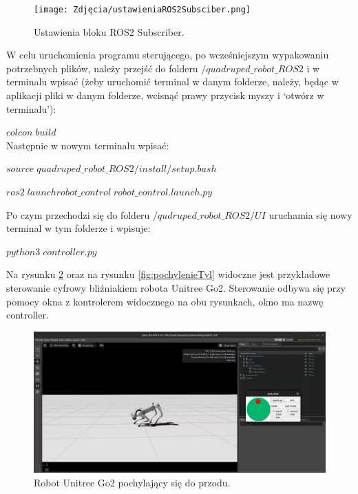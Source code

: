 \documentclass[12pt]{article}
\begin{document}
\begin{figure}[h]
    \centering
    \texttt{[image: Zdjęcia/ustawieniaROS2Subsciber.png]}
    \caption{Ustawienia bloku ROS2 Subscriber.}
    \label{fig:subscriberROS2}
\end{figure}



\noindent W celu uruchomienia programu sterującego, po wcześniejszym wypakowaniu potrzebnych plików,  należy przejść do folderu $/quadruped\_robot\_ROS2$ i w terminalu wpisać (żeby uruchomić terminal w danym folderze, należy, będąc w aplikacji pliki w danym folderze, wcisnąć prawy przycisk myszy i ‘otwórz w terminalu’):

\noindent $colcon\; build$\\

Następnie w nowym terminalu wpisać:


$source\; quadruped\_robot\_ROS2/install/setup.bash$

$ros2\; launch robot\_control\; robot\_control.launch.py$

\vspace{15px}

 \noindent Po czym przechodzi się do folderu $/qudruped\_robot\_ROS2/UI$ uruchamia się nowy terminal w tym folderze i wpisuje:

$python3\; controller.py$

\clearpage
 
\noindent Na rysunku \ref{fig:pochyleniePrzod} oraz na rysunku \ref{fig:pochylenieTyl} widoczne jest przykładowe sterowanie cyfrowy bliźniakiem robota Unitree Go2. Sterowanie odbywa się przy pomocy okna z kontrolerem widocznego na obu rysunkach, okno ma nazwę controller.



\begin{figure}[h]
    \centering
    \includegraphics[width=0.8\linewidth]{Zdjęcia/pochyleniePrzod.png}
    \caption{Robot Unitree Go2 pochylający się do przodu.}
    \label{fig:pochyleniePrzod}
\end{figure}
\end{document}
